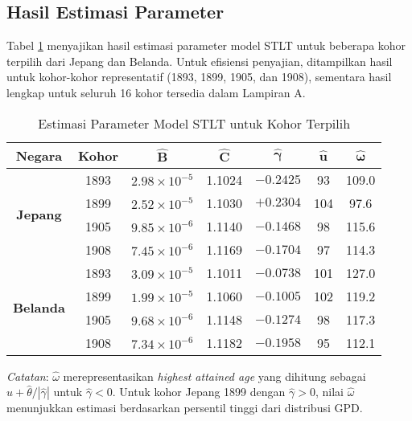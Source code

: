 \subsection{Hasil Estimasi Parameter}

Tabel \ref{tab:stlt_params_selected_cohorts} menyajikan hasil estimasi parameter model STLT untuk beberapa kohor terpilih dari Jepang dan Belanda. Untuk efisiensi penyajian, ditampilkan hasil untuk kohor-kohor representatif (1893, 1899, 1905, dan 1908), sementara hasil lengkap untuk seluruh 16 kohor tersedia dalam Lampiran A.

\begin{table}[H]
\centering
\caption{Estimasi Parameter Model STLT untuk Kohor Terpilih}
\label{tab:stlt_params_selected_cohorts}
\small
\begin{tabular}{ccccccc}
\hline
\textbf{Negara} & \textbf{Kohor} & $\boldsymbol{\hat{B}}$ & $\boldsymbol{\hat{C}}$ & $\boldsymbol{\hat{\gamma}}$ & $\boldsymbol{\hat{u}}$ & $\boldsymbol{\hat{\omega}}$ \\
\hline
\multirow{4}{*}{\textbf{Jepang}} 
& 1893 & $2.98 \times 10^{-5}$ & 1.1024 & $-0.2425$ & 93 & 109.0 \\
& 1899 & $2.52 \times 10^{-5}$ & 1.1030 & $+0.2304$ & 104 & 97.6 \\
& 1905 & $9.85 \times 10^{-6}$ & 1.1140 & $-0.1468$ & 98 & 115.6 \\
& 1908 & $7.45 \times 10^{-6}$ & 1.1169 & $-0.1704$ & 97 & 114.3 \\
\hline
\multirow{4}{*}{\textbf{Belanda}} 
& 1893 & $3.09 \times 10^{-5}$ & 1.1011 & $-0.0738$ & 101 & 127.0 \\
& 1899 & $1.99 \times 10^{-5}$ & 1.1060 & $-0.1005$ & 102 & 119.2 \\
& 1905 & $9.68 \times 10^{-6}$ & 1.1148 & $-0.1274$ & 98 & 117.3 \\
& 1908 & $7.34 \times 10^{-6}$ & 1.1182 & $-0.1958$ & 95 & 112.1 \\
\hline
\end{tabular}
\begin{tablenotes}
\small
\item \textit{Catatan}: $\hat{\omega}$ merepresentasikan \textit{highest attained age} yang dihitung sebagai $\hat{u} + \hat{\theta}/|\hat{\gamma}|$ untuk $\hat{\gamma} < 0$. Untuk kohor Jepang 1899 dengan $\hat{\gamma} > 0$, nilai $\hat{\omega}$ menunjukkan estimasi berdasarkan persentil tinggi dari distribusi GPD.
\end{tablenotes}
\end{table}



